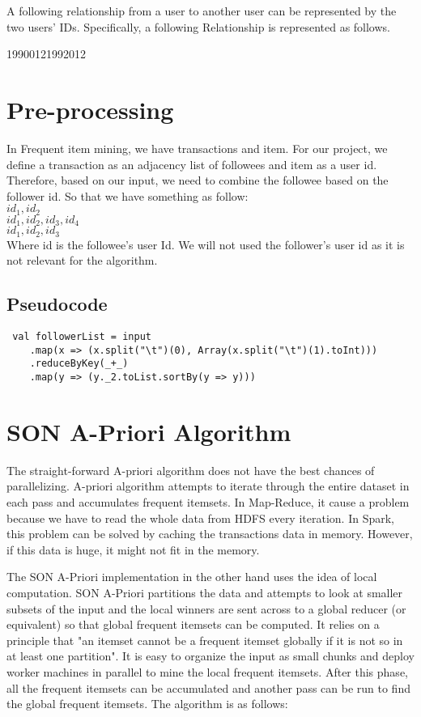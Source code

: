 \documentclass[11pt]{article}
\begin{document}
A following relationship from a user to another user can be represented by the two users' IDs.
Specifically, a following Relationship is represented as follows.

1990012\hspace{1cm}1992012 \\

\newpage
\section{Pre-processing}
In Frequent item mining, we have transactions and item.
For our project, we define a transaction as an adjacency list of followees and item as a user id.
Therefore, based on our input, we need to combine the followee based on the follower id.
So that we have something as follow: \\

$id_1, id_2$ \\
$id_1, id_2, id_3, id_4$ \\
$id_1, id_2, id_3$ \\

Where id is the followee's user Id.
We will not used the follower's user id as it is not relevant for the algorithm.

\subsection{Pseudocode}

\begin{lstlisting}
 val followerList = input
    .map(x => (x.split("\t")(0), Array(x.split("\t")(1).toInt)))
    .reduceByKey(_+_)
    .map(y => (y._2.toList.sortBy(y => y)))
\end{lstlisting}

\section{SON A-Priori Algorithm}

The straight-forward A-priori algorithm does not have the best chances of parallelizing.
A-priori algorithm attempts to iterate through the entire dataset in each pass and accumulates frequent itemsets.
In Map-Reduce, it cause a problem because we have to read the whole data from HDFS every iteration.
In Spark, this problem can be solved by caching the transactions data in memory.
However, if this data is huge, it might not fit in the memory.

The SON A-Priori implementation in the other hand uses the idea of local computation.
SON A-Priori partitions the data and attempts to look at smaller subsets of the input and the local winners are sent across to a global reducer (or equivalent) so that global frequent itemsets can be computed.
It relies on a principle that "an itemset cannot be a frequent itemset globally if it is not so in at least one partition".
It is easy to organize the input as small chunks and deploy worker machines in parallel to mine the local frequent itemsets.
After this phase, all the frequent itemsets can be accumulated and another pass can be run to find the global frequent itemsets.
The algorithm is as follows: \\
\end{document}

